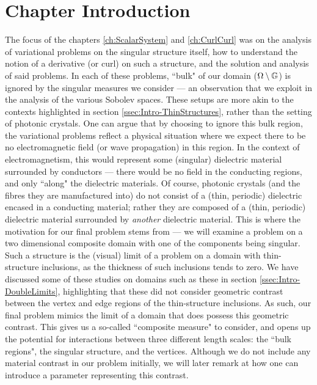\section{Chapter Introduction} \label{sec:SingIncChapterIntro}
The focus of the chapters \ref{ch:ScalarSystem} and \ref{ch:CurlCurl} was on the analysis of variational problems on the singular structure itself, how to understand the notion of a derivative (or curl) on such a structure, and the solution and analysis of said problems.
In each of these problems, ``bulk" of our domain ($\Omega\setminus\mathbb{G}$) is ignored by the singular measures we consider --- an observation that we exploit in the analysis of the various Sobolev spaces.
These setups are more akin to the contexts highlighted in section \ref{ssec:Intro-ThinStructures}, rather than the setting of photonic crystals.
One can argue that by choosing to ignore this bulk region, the variational problems reflect a physical situation where we expect there to be no electromagnetic field (or wave propagation) in this region.
In the context of electromagnetism, this would represent some (singular) dielectric material surrounded by conductors --- there would be no field in the conducting regions, and only ``along" the dielectric materials.
Of course, photonic crystals (and the fibres they are manufactured into) do not consist of a (thin, periodic) dielectric encased in a conducting material; rather they are composed of a (thin, periodic) dielectric material surrounded by \emph{another} dielectric material.
This is where the motivation for our final problem stems from --- we will examine a problem on a two dimensional composite domain with one of the components being singular.
Such a structure is the (visual) limit of a problem on a domain with thin-structure inclusions, as the thickness of such inclusions tends to zero.
We have discussed some of these studies on domains such as these in section \ref{ssec:Intro-DoubleLimits}, highlighting that these did not consider geometric contrast between the vertex and edge regions of the thin-structure inclusions.
As such, our final problem mimics the limit of a domain that does possess this geometric contrast.
This gives us a so-called ``composite measure" to consider, and opens up the potential for interactions between three different length scales: the ``bulk regions", the singular structure, and the vertices.
Although we do not include any material contrast in our problem initially, we will later remark at how one can introduce a parameter representing this contrast.

